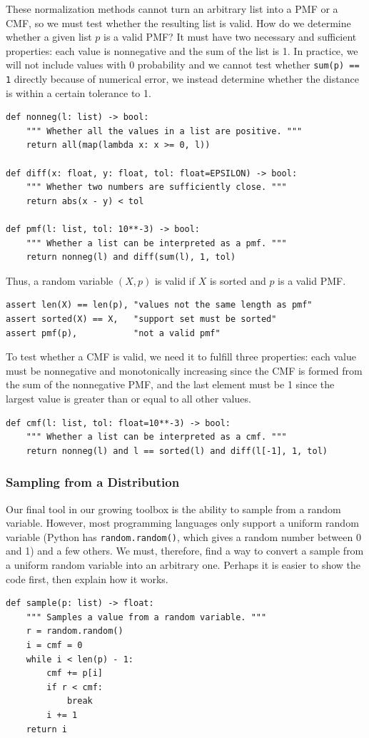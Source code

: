 \documentclass[11pt, oneside]{article}
\theoremstyle{plain}
\theoremstyle{definition}
\begin{document}
These normalization methods cannot turn an arbitrary list into a PMF or a CMF,
so we must test whether the resulting list is valid.
How do we determine whether a given list \( p \) is a valid PMF? It must have
two necessary and sufficient properties: each value is nonnegative and the sum
of the list is 1. In practice, we will not include values with 0 probability
and we cannot test whether \texttt{sum(p) == 1} directly because of
numerical error, we instead determine whether the distance is within a certain
tolerance to 1.
\begin{verbatim}
def nonneg(l: list) -> bool:
    """ Whether all the values in a list are positive. """
    return all(map(lambda x: x >= 0, l))

def diff(x: float, y: float, tol: float=EPSILON) -> bool:
    """ Whether two numbers are sufficiently close. """
    return abs(x - y) < tol

def pmf(l: list, tol: 10**-3) -> bool:
    """ Whether a list can be interpreted as a pmf. """
    return nonneg(l) and diff(sum(l), 1, tol)
\end{verbatim}

Thus, a random variable \( (X, p) \) is valid if
\( X \) is sorted and \( p \) is a valid PMF.
\begin{verbatim}
assert len(X) == len(p), "values not the same length as pmf"
assert sorted(X) == X,   "support set must be sorted"
assert pmf(p),           "not a valid pmf"
\end{verbatim}

To test whether a CMF is valid, we need it to fulfill three properties: each
value must be nonnegative and monotonically increasing since the CMF is formed
from the sum of the nonnegative PMF, and the last element must be 1 since the
largest value is greater than or equal to all other values.
\begin{verbatim}
def cmf(l: list, tol: float=10**-3) -> bool:
    """ Whether a list can be interpreted as a cmf. """
    return nonneg(l) and l == sorted(l) and diff(l[-1], 1, tol)
\end{verbatim}

\subsubsection{Sampling from a Distribution}
Our final tool in our growing toolbox is the ability to sample from a random
variable. However, most programming languages only support a uniform random
variable (Python has \texttt{random.random()}, which gives a random number
between 0 and 1) and a few others. We must, therefore, find a way to convert
a sample from a uniform random variable into an arbitrary one. Perhaps it is
easier to show the code first, then explain how it works.
\begin{verbatim}
def sample(p: list) -> float:
    """ Samples a value from a random variable. """
    r = random.random()
    i = cmf = 0
    while i < len(p) - 1:
        cmf += p[i]
        if r < cmf:
            break
        i += 1
    return i
\end{verbatim}
\end{document}
